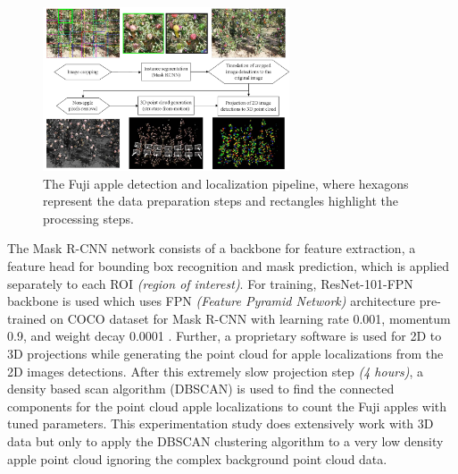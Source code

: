 \documentclass{article}
\begin{document}
\begin{figure}[h]
    \centering
    \includegraphics[width=0.65\textwidth]{fuji-sfm-pipeline.png}
    \caption{The Fuji apple detection and localization pipeline, where hexagons represent the data preparation steps and rectangles highlight the processing steps.}
    \label{fig:fuji-sfm-pipeline}
\end{figure}


The Mask R-CNN network consists of a backbone for feature extraction, a feature head for bounding box recognition and mask prediction, which is applied separately to each ROI \textit{(region of interest)}.
For training, ResNet-101-FPN backbone is used which uses FPN \textit{(Feature Pyramid Network)} architecture pre-trained on COCO dataset for Mask R-CNN with learning rate 0.001, momentum 0.9, and weight decay 0.0001 \cite{lin2017feature, he2016identity, lin2014microsoft}.
Further, a proprietary software is used for 2D to 3D projections while generating the point cloud for apple localizations from the 2D images detections.
After this extremely slow projection step \textit{(4 hours)}, a density based scan algorithm (DBSCAN) is used to find the connected components for the point cloud apple localizations to count the Fuji apples with tuned parameters.
This experimentation study does extensively work with 3D data but only to apply the DBSCAN clustering algorithm to a very low density apple point cloud ignoring the complex background point cloud data.
\end{document}

